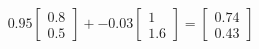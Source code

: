 \documentclass[preview]{standalone}
\begin{document}
\begin{align*}
0.95 \begin{bmatrix} 0.8 \\ 0.5 \end{bmatrix} + -0.03 \begin{bmatrix} 1 \\ 1.6 \end{bmatrix} = \begin{bmatrix} 0.74 \\ 0.43 \end{bmatrix}
\end{align*}
\end{document}
